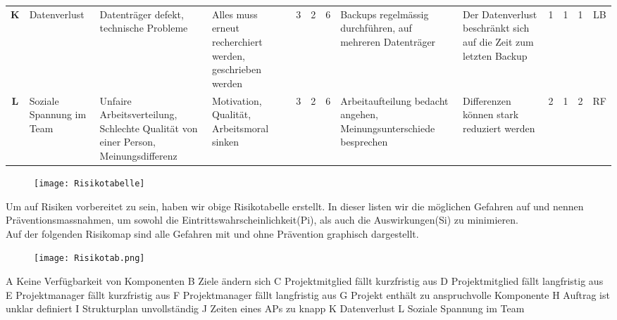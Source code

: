 \begin{table}[H]
{\begin{tabular}{c|>{\HY\RaggedRight}p{2.5cm}|>{\HY\RaggedRight}p{2.5cm}|>{\HY\RaggedRight}p{2.5cm}|c|c|c|>{\HY\RaggedRight}p{3cm}|>{\HY\RaggedRight}p{3cm}|c|c|c|c}
\textbf{K}			&Datenverlust									&Datenträger defekt, technische Probleme												&Alles muss erneut recherchiert werden, geschrieben werden		&3			&2			&\cellcolor{orange}6				&Backups regelmässig durchführen, auf mehreren Datenträger												&Der Datenverlust beschränkt sich auf die Zeit zum letzten Backup												&1				&1				&\cellcolor{dgruen}1		&LB\\
\rowcolor{grau}
\textbf{L}			&Soziale Spannung im Team						&Unfaire Arbeitsverteilung, Schlechte Qualität von einer Person, Meinungsdifferenz		&Motivation, Qualität, Arbeitsmoral sinken						&3			&2			&\cellcolor{orange}6				&Arbeitaufteilung bedacht angehen, Meinungsunterschiede besprechen										&Differenzen können stark reduziert werden																	&2				&1				&\cellcolor{hgruen}2		&RF\\
\end{tabular}
}
\end{table}


\newpage
\begin{figure}[H]
	\centering
	\texttt{[image: Risikotabelle]}
	\label{fig:Tabelle}
\end{figure}
Um auf Risiken vorbereitet zu sein, haben wir obige Risikotabelle erstellt. In dieser listen wir die möglichen Gefahren auf und nennen Präventionsmassnahmen, um sowohl die Eintrittswahrscheinlichkeit(Pi), als auch die Auswirkungen(Si) zu minimieren.\\
Auf der folgenden Risikomap sind alle Gefahren mit und ohne Prävention graphisch dargestellt.

\begin{figure}[H]
	\centering
	\texttt{[image: Risikotab.png]}
	\label{fig:Risikodiagramm}
\end{figure}


A 	Keine Verfügbarkeit von Komponenten \newline 
B 	Ziele ändern sich\newline 
C 	Projektmitglied fällt kurzfristig aus\newline 
D	Projektmitglied fällt langfristig aus\newline 
E 	Projektmanager fällt kurzfristig aus\newline 
F 	Projektmanager fällt langfristig aus\newline 
G	Projekt enthält zu anspruchvolle Komponente\newline 
H	Auftrag ist unklar definiert\newline 
I	Strukturplan unvollständig\newline 
J	Zeiten eines APs zu knapp\newline 
K	Datenverlust\newline 
L	Soziale Spannung im Team\newline 
